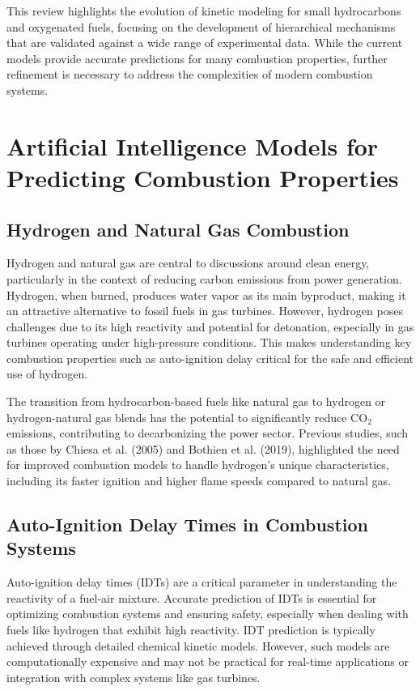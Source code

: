 \documentclass[12pt]{report}
\begin{document}
\bigskip

This review highlights the evolution of kinetic modeling for small hydrocarbons and oxygenated fuels, focusing on the development of hierarchical mechanisms that are validated against a wide range of experimental data. While the current models provide accurate predictions for many combustion properties, further refinement is necessary to address the complexities of modern combustion systems.



\section{Artificial Intelligence Models for Predicting Combustion Properties}

\subsection{Hydrogen and Natural Gas Combustion}
Hydrogen and natural gas are central to discussions around clean energy, particularly in the context of reducing carbon emissions from power generation. Hydrogen, when burned, produces water vapor as its main byproduct, making it an attractive alternative to fossil fuels in gas turbines. However, hydrogen poses challenges due to its high reactivity and potential for detonation, especially in gas turbines operating under high-pressure conditions. This makes understanding key combustion properties such as auto-ignition delay critical for the safe and efficient use of hydrogen.

The transition from hydrocarbon-based fuels like natural gas to hydrogen or hydrogen-natural gas blends has the potential to significantly reduce CO$_2$ emissions, contributing to decarbonizing the power sector. Previous studies, such as those by Chiesa et al. (2005) and Bothien et al. (2019), highlighted the need for improved combustion models to handle hydrogen’s unique characteristics, including its faster ignition and higher flame speeds compared to natural gas.

\subsection{Auto-Ignition Delay Times in Combustion Systems}
Auto-ignition delay times (IDTs) are a critical parameter in understanding the reactivity of a fuel-air mixture. Accurate prediction of IDTs is essential for optimizing combustion systems and ensuring safety, especially when dealing with fuels like hydrogen that exhibit high reactivity. IDT prediction is typically achieved through detailed chemical kinetic models. However, such models are computationally expensive and may not be practical for real-time applications or integration with complex systems like gas turbines.
\end{document}
